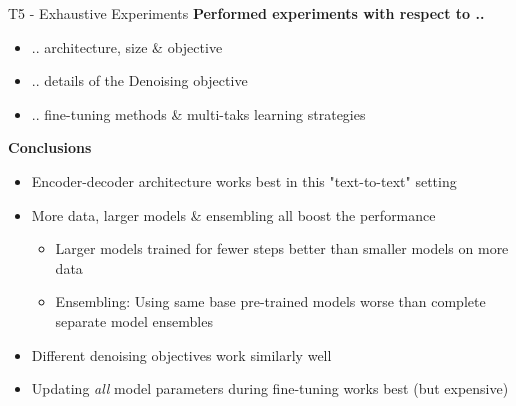 \documentclass[]{beamer}
\begin{document}
\begin{frame}{T5 - Exhaustive Experiments}
\small
	\textbf{Performed experiments with respect to ..}
	
	\begin{itemize}
		\item .. architecture, size \& objective
		\item .. details of the Denoising objective
		\item .. fine-tuning methods \& multi-taks learning strategies
	\end{itemize}
	
	\textbf{Conclusions}
	
	\begin{itemize}
		\item Encoder-decoder architecture works best in this "text-to-text" setting
		\item More data, larger models \& ensembling all boost the performance
			\begin{itemize}
				\item Larger models trained for fewer steps better than smaller models on more data
				\item Ensembling: Using same base pre-trained models worse than complete separate model ensembles
			\end{itemize}
		\item Different denoising objectives work similarly well
		\item Updating \textit{all} model parameters during fine-tuning works best (but expensive)
	\end{itemize}
\end{frame}
\end{document}

